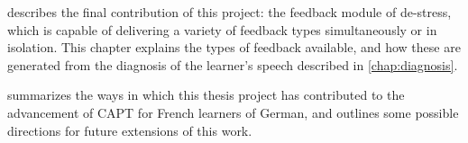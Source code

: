 describes the final contribution of this project: the feedback module of de-stress, which is capable of delivering a variety of feedback types simultaneously or in isolation. 
This chapter explains the types of feedback available, and how these are generated from the diagnosis of the learner's speech described in \cref{chap:diagnosis}.


 summarizes the ways in which this thesis project has contributed to the advancement of CAPT for French learners of German,
and
outlines some
possible directions for future extensions of this work.




%

